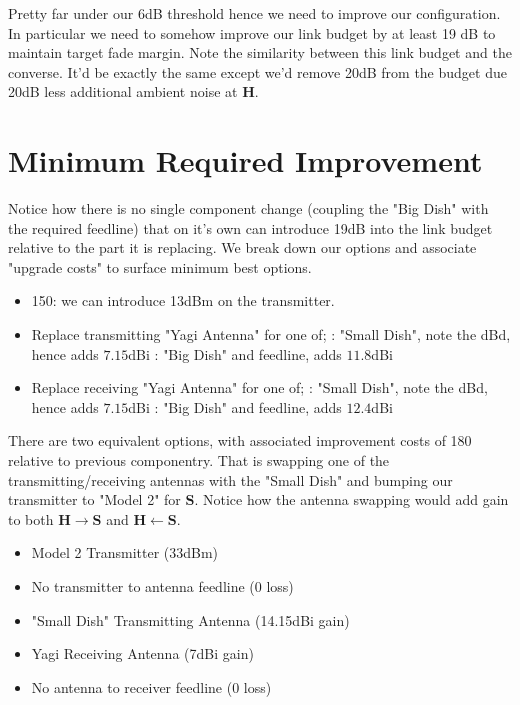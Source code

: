 \documentclass{article}
\begin{document}
Pretty far under our 6dB threshold hence we need to improve our configuration. In particular we need to somehow improve our link budget by at least 19 dB to maintain target fade margin. Note the similarity between this link budget and the converse. It'd be exactly the same except we'd remove 20dB from the budget due 20dB less additional ambient noise at $\boldsymbol{H}$.

\newpage

\section*{Minimum Required Improvement}
Notice how there is no single component change (coupling the "Big Dish" with the required feedline) that on it's own can introduce 19dB into the link budget relative to the part it is replacing. We break down our options and associate "upgrade costs" to surface minimum best options.

\begin{itemize}
				\item 150: we can introduce 13dBm on the transmitter.
				\item Replace transmitting "Yagi Antenna" for one of;
								: "Small Dish", note the dBd, hence adds $7.15$dBi
								: "Big Dish" and feedline, adds $11.8$dBi
				\item Replace receiving "Yagi Antenna" for one of;
								: "Small Dish", note the dBd, hence adds $7.15$dBi
								: "Big Dish" and feedline, adds $12.4$dBi
\end{itemize}

There are two equivalent options, with associated improvement costs of 180 relative to previous componentry. That is swapping one of the transmitting/receiving antennas with the "Small Dish" and bumping our transmitter to "Model 2" for $\boldsymbol{S}$. Notice how the antenna swapping would add gain to both $\boldsymbol{H} \rightarrow \boldsymbol{S}$ and $\boldsymbol{H} \leftarrow \boldsymbol{S}$.


\begin{itemize}
				\item Model 2 Transmitter (33dBm)
				\item No transmitter to antenna feedline (0 loss)
				\item "Small Dish" Transmitting Antenna (14.15dBi gain)
				\item Yagi Receiving Antenna (7dBi gain)
				\item No antenna to receiver feedline (0 loss)
\end{itemize}
\end{document}
